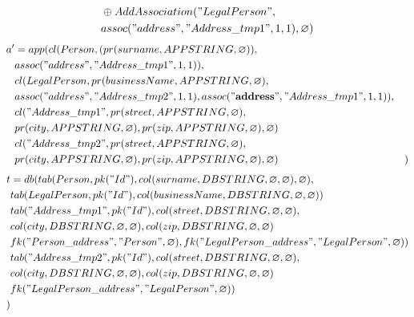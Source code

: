 \documentclass[11pt]{article}
\begin{document}
\newpage
\begin{align*}
& \oplus AddAssociation("LegalPerson", \\
& assoc("address", "Address\_tmp1", 1, 1),\varnothing) \\
\end{align*}
\hline
\begin{align*}
a' &= app(cl(Person, (pr(surname, APPSTRING, \varnothing)), \\ 
& assoc("address", "Address\_tmp1", 1, 1)), \\ 
& cl(LegalPerson, pr(businessName, APPSTRING, \varnothing),\\
& assoc("address", "Address\_tmp2", 1, 1), assoc(\mathbf{"address"}, "Address\_tmp1", 1, 1)), \\
& cl("Address\_tmp1", pr(street, APPSTRING, \varnothing), \\
& pr(city, APPSTRING, \varnothing), pr(zip, APPSTRING, \varnothing), \varnothing) \\
& cl("Address\_tmp2", pr(street, APPSTRING, \varnothing), \\
& pr(city, APPSTRING, \varnothing), pr(zip, APPSTRING, \varnothing), \varnothing)
& )
\end{align*}
\begin{align*}
t &= db(tab(Person, pk("Id"), col(surname, DBSTRING, \varnothing, \varnothing), \varnothing), \\
& tab(LegalPerson, pk("Id"),  col(businessName, DBSTRING, \varnothing, \varnothing)) \\
& tab("Address\_tmp1", pk("Id"), col(street, DBSTRING, \varnothing, \varnothing),\\
& col(city, DBSTRING, \varnothing, \varnothing), col(zip, DBSTRING, \varnothing, \varnothing) \\
& fk("Person\_address", "Person", \varnothing), fk("LegalPerson\_address", "LegalPerson", \varnothing))\\
& tab("Address\_tmp2", pk("Id"), col(street, DBSTRING, \varnothing, \varnothing),\\
& col(city, DBSTRING, \varnothing, \varnothing), col(zip, DBSTRING, \varnothing, \varnothing) \\
& fk("LegalPerson\_address", "LegalPerson", \varnothing))\\
) 
\end{align*}
\end{document}
